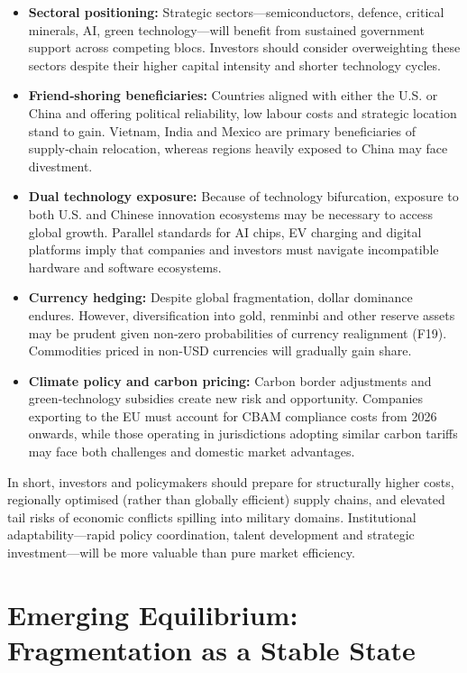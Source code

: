 \documentclass{article}
\begin{document}
\begin{itemize}
\item \textbf{Sectoral positioning:}  Strategic sectors—semiconductors, defence, critical minerals, AI, green technology—will benefit from sustained government support across competing blocs.  Investors should consider overweighting these sectors despite their higher capital intensity and shorter technology cycles.

\item \textbf{Friend‑shoring beneficiaries:}  Countries aligned with either the U.S. or China and offering political reliability, low labour costs and strategic location stand to gain.  Vietnam, India and Mexico are primary beneficiaries of supply‑chain relocation, whereas regions heavily exposed to China may face divestment.

\item \textbf{Dual technology exposure:}  Because of technology bifurcation, exposure to both U.S. and Chinese innovation ecosystems may be necessary to access global growth.  Parallel standards for AI chips, EV charging and digital platforms imply that companies and investors must navigate incompatible hardware and software ecosystems.

\item \textbf{Currency hedging:}  Despite global fragmentation, dollar dominance endures.  However, diversification into gold, renminbi and other reserve assets may be prudent given non‑zero probabilities of currency realignment (F19).  Commodities priced in non‑USD currencies will gradually gain share.

\item \textbf{Climate policy and carbon pricing:}  Carbon border adjustments and green‑technology subsidies create new risk and opportunity.  Companies exporting to the EU must account for CBAM compliance costs from 2026 onwards, while those operating in jurisdictions adopting similar carbon tariffs may face both challenges and domestic market advantages.
\end{itemize}

In short, investors and policymakers should prepare for structurally higher costs, regionally optimised (rather than globally efficient) supply chains, and elevated tail risks of economic conflicts spilling into military domains.  Institutional adaptability—rapid policy coordination, talent development and strategic investment—will be more valuable than pure market efficiency.

\section{Emerging Equilibrium: Fragmentation as a Stable State}
\end{document}

